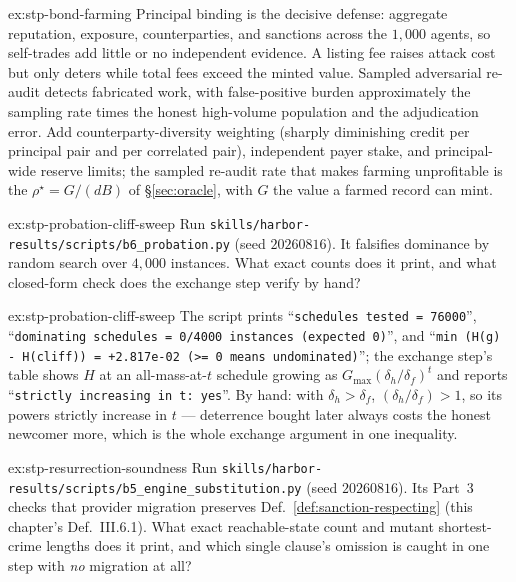 \documentclass[11pt,a4paper]{article}
\theoremstyle{definition}
\begin{document}
\begin{pdsolution}{ex:stp-bond-farming}
Principal binding is the decisive defense: aggregate reputation,
exposure, counterparties, and sanctions across the $1{,}000$ agents, so
self-trades add little or no independent evidence. A listing fee raises
attack cost but only deters while total fees exceed the minted value. Sampled
adversarial re-audit detects fabricated work, with false-positive burden
approximately the sampling rate times the honest high-volume population and
the adjudication error. Add counterparty-diversity weighting (sharply diminishing
credit per principal pair and per correlated pair), independent payer stake, and
principal-wide reserve limits; the sampled re-audit rate that makes farming
unprofitable is the $\rho^\star=G/(dB)$ of \S\ref{sec:oracle}, with $G$ the
value a farmed record can mint.
\end{pdsolution}
\begin{pdexercise}[kind=Trace,rating=2]{ex:stp-probation-cliff-sweep}
Run \texttt{skills/harbor-results/scripts/b6\_probation.py} (seed $20260816$).
It falsifies dominance by random search over $4{,}000$ instances. What exact
counts does it print, and what closed-form check does the exchange step
verify by hand?
\end{pdexercise}
\begin{pdsolution}{ex:stp-probation-cliff-sweep}
The script prints ``\texttt{schedules tested = 76000}'', ``\texttt{dominating
schedules = 0/4000 instances (expected 0)}'', and
``\texttt{min (H(g) - H(cliff)) = +2.817e-02 (>= 0 means undominated)}''; the
exchange step's table shows $H$ at an all-mass-at-$t$ schedule growing as
$G_{\max}(\delta_h/\delta_f)^t$ and reports ``\texttt{strictly increasing in
t: yes}''. By hand: with $\delta_h>\delta_f$, $(\delta_h/\delta_f)>1$, so its
powers strictly increase in $t$ --- deterrence bought later always costs the
honest newcomer more, which is the whole exchange argument in one inequality.
\end{pdsolution}
\begin{pdexercise}[kind=Trace,rating=2]{ex:stp-resurrection-soundness}
Run \texttt{skills/harbor-results/scripts/b5\_engine\_substitution.py} (seed
$20260816$). Its Part~3 checks that provider migration preserves
Def.~\ref{def:sanction-respecting} (this chapter's Def.~III.6.1). What exact
reachable-state count and mutant shortest-crime lengths does it print, and
which single clause's omission is caught in one step with \emph{no}
migration at all?
\end{pdexercise}
\end{document}
